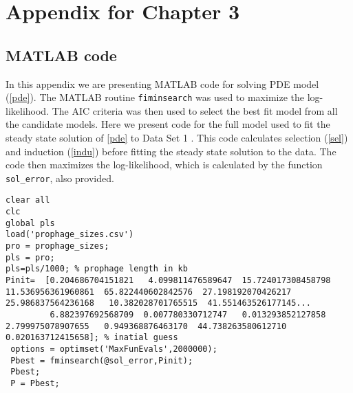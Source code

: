 \chapter{Appendix for Chapter 3}\label{AppC1}
\section{MATLAB code}
In this appendix we are presenting MATLAB \cite{MATLAB:R2018b} code for solving PDE model (\ref{pde}). The MATLAB routine \texttt{fiminsearch} was used to maximize the log-likelihood. The AIC criteria was then used to select the best fit model from all the candidate models.  Here we present code for the full model used to fit the steady state solution of \ref{pde} to Data Set 1 \cite{bobay_pervasive_2014}. This code calculates  selection (\ref{sel}) and induction (\ref{indu}) before fitting the steady state solution to the data. 
The code then maximizes the log-likelihood, which is calculated by the function \texttt{sol\_error}, also provided. 
\begin{lstlisting}
clear all
clc
global pls 
load('prophage_sizes.csv')
pro = prophage_sizes;
pls = pro;
pls=pls/1000; % prophage length in kb
Pinit=  [0.204686704151821   4.099811476589647  15.724017308458798  11.536956361960861  65.822440602842576  27.198192070426217  25.986837564236168   10.382028701765515  41.551463526177145...
         6.882397692568709  0.007780330712747   0.013293852127858   2.799975078907655   0.949368876463170  44.738263580612710   0.020163712415658]; % inatial guess
 options = optimset('MaxFunEvals',2000000);
 Pbest = fminsearch(@sol_error,Pinit);
 Pbest;
 P = Pbest;
\end{lstlisting}
